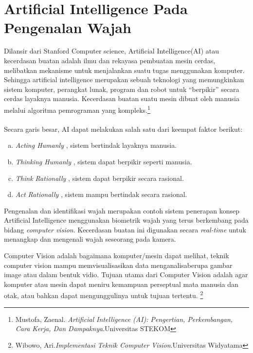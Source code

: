 \section{Artificial Intelligence Pada Pengenalan Wajah}
 Dilansir dari Stanford Computer science, Artificial Intelligence(AI) atau kecerdasan buatan adalah ilmu dan rekayasa pembuatan mesin cerdas, melibatkan mekanisme untuk menjalankan
 suatu tugas menggunakan komputer.  Sehingga artificial intelligence merupakan sebuah teknologi yang memungkinkan sistem komputer, perangkat lunak, program dan robot untuk “berpikir” 
 secara cerdas layaknya manusia. Kecerdasan buatan suatu mesin dibuat oleh manusia melalui algoritma pemrograman yang kompleks.\footnote{Mustofa, Zaenal. \emph{Artificial Intelligence (AI): 
 Pengertian, Perkembangan, Cara Kerja, Dan Dampaknya}.Universitas STEKOM} \\
\\Secara garis besar, AI dapat melakukan salah satu dari keempat faktor berikut:
\begin{enumerate}[a.]
    \item \emph{Acting Humanly} , sistem bertindak layaknya manusia.
    \item \emph{Thinking Humanly} , sistem dapat berpikir seperti manusia.
    \item \emph{Think Rationally} , sistem dapat berpikir secara rasional.
    \item \emph{Act Rationally} , sistem mampu bertindak secara rasional.
\end{enumerate}

Pengenalan dan identifikasi wajah merupakan contoh sistem penerapan konsep Artificial Intelligence menggunakan biometrik wajah yang terus berkembang pada bidang \emph{computer vision}. 
Kecerdasan buatan ini digunakan secara \emph{real-time} untuk menangkap dan mengenali wajah seseorang pada kamera.

Computer Vision adalah bagaimana komputer/mesin dapat melihat, teknik computer vision mampu memvisualisasikan data menganalisaberupa gambar image atau dalam bentuk vidio. Tujuan utama dari 
Computer Vision adalah agar komputer atau mesin dapat meniru kemampuan perseptual mata manusia dan otak, atau bahkan dapat mengunggulinya untuk tujuan tertentu.
\footnote{Wibowo, Ari.\emph{Implementasi Teknik Computer Vision}.Universitas Widyatama}
